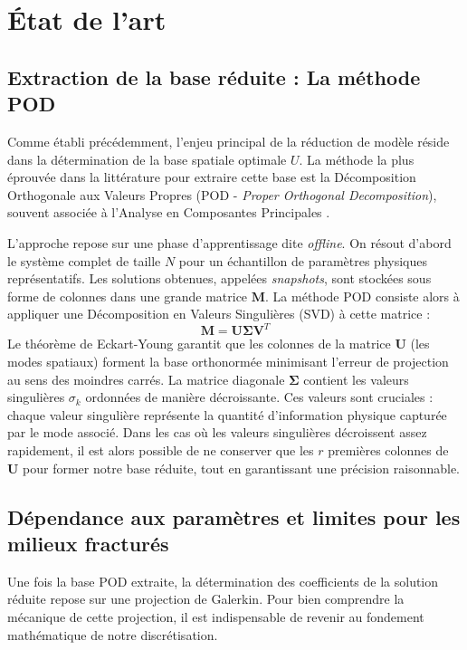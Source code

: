 \documentclass[12pt,a4paper]{article}
\begin{document}
\section{État de l'art}

\subsection{Extraction de la base réduite : La méthode POD}

Comme établi précédemment, l'enjeu principal de la réduction de modèle réside dans la détermination de la base spatiale optimale $U$. La méthode la plus éprouvée dans la littérature pour extraire cette base est la Décomposition Orthogonale aux Valeurs Propres (POD - \textit{Proper Orthogonal Decomposition}), souvent associée à l'Analyse en Composantes Principales \cite{pod_intro}.

L'approche repose sur une phase d'apprentissage dite \textit{offline}. On résout d'abord le système complet de taille $N$ pour un échantillon de paramètres physiques représentatifs. Les solutions obtenues, appelées \textit{snapshots}, sont stockées sous forme de colonnes dans une grande matrice $\mathbf{M}$. La méthode POD consiste alors à appliquer une Décomposition en Valeurs Singulières (SVD) à cette matrice :
\begin{equation*}
    \mathbf{M} = \mathbf{U} \mathbf{\Sigma} \mathbf{V}^T
\end{equation*}
Le théorème de Eckart-Young garantit que les colonnes de la matrice $\mathbf{U}$ 
(les modes spatiaux) forment la base orthonormée minimisant l'erreur de 
projection au sens des moindres carrés. La matrice diagonale 
$\mathbf{\Sigma}$ contient les valeurs singulières $\sigma_k$ ordonnées de manière décroissante. Ces valeurs sont cruciales : chaque valeur singulière représente la quantité d'information physique capturée par 
le mode associé. Dans les cas où les valeurs singulières décroissent assez rapidement, il est alors possible de ne conserver que les $r$ premières colonnes de $\mathbf{U}$ pour former notre base réduite, tout en garantissant une précision raisonnable.

\subsection{Dépendance aux paramètres et limites pour les milieux fracturés}


Une fois la base POD extraite, la détermination des coefficients de la solution réduite repose sur une projection de Galerkin. Pour bien comprendre la mécanique de cette projection, il est indispensable de revenir au fondement mathématique de notre discrétisation. 
\end{document}

